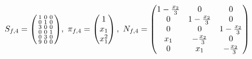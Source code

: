 \documentclass[fleqn]{article}
\begin{document}
\bigskip

$
S_{f,4} = \spmqty{ 1 & 0 & 0 \\ 0 & 1 & 0 \\ 3 & 0 & 0 \\ 0 & 0 & 1 \\ 0 & 3 & 0 \\ 9 & 0 & 0 },~
\pi_{f,4} = \pmqty{
    1       \\
    x_{1}   \\
    x_{1}^2 \\
},~
N_{f,4} = \pmqty{
    1-\frac{x_{2}}{3} & 0                 & 0                 \\
    0                 & 1-\frac{x_{2}}{3} & 0                 \\
    0                 & 0                 & 1-\frac{x_{2}}{3} \\
    x_{1}             & -\frac{x_{2}}{3}  & 0                 \\
    0                 & x_{1}             & -\frac{x_{2}}{3}  \\
}
$

\bigskip
\end{document}
